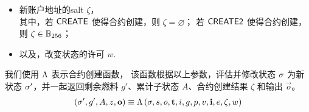 \begin{itemize}[nosep]
	\item 新账户地址的salt $\zeta$，\\
	其中，若 {\hyperlink{create}{$\mathsf{CREATE}$}} 使得合约创建，则 $\zeta = \varnothing$；
	若 {\hyperlink{create2}{$\mathsf{CREATE2}$}} 使得合约创建，则 $\zeta\in \mathbb{B}_{256}$；

	\item 以及，改变状态的许可 $w$.
\end{itemize}


我们使用 $\mathrm{\Lambda}$ 表示合约创建函数，
该函数根据以上参数，评估并修改状态 $\mathbf{\sigma}$ 为新状态 $\mathbf{\sigma}'$，并一起返回剩余燃料 $g'$、累计子状态 $A$、合约创建结果 $\zeta$ 和输出 $\vec{o}$。
\begin{align}
	\left(\mathbf{\sigma}',g', A, z, \mathbf{o} \right)\equiv \mathrm{\Lambda}\left(\mathbf{\sigma}, s, o, \mathbf{t},i, g, p, v, \mathbf{i}, e, \zeta,w \right)
\end{align}

